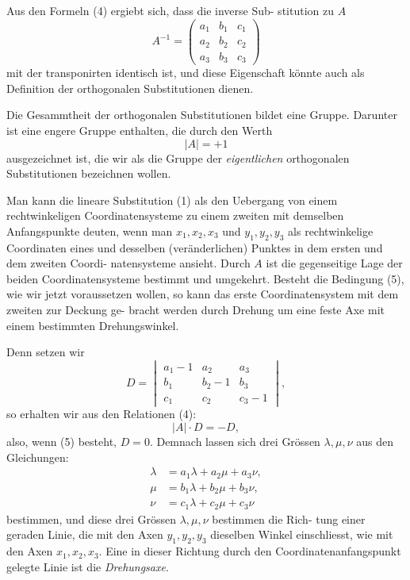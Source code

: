 \documentclass[12pt,a4paper]{article}
\theoremstyle{plain}
\theoremstyle{definition}
\theoremstyle{remark}
\begin{document}
Aus den Formeln (4) ergiebt sich, dass die inverse Sub-
stitution zu $A$
\[
A^{-1} = \begin{pmatrix}
a_1 & b_1 & c_1\\
a_2 & b_2 & c_2\\
a_3 & b_3 & c_3
\end{pmatrix}
\]
mit der transponirten identisch ist, und diese Eigenschaft k\"onnte
auch als Definition der orthogonalen Substitutionen dienen.

Die Gesammtheit der orthogonalen Substitutionen bildet
eine Gruppe. Darunter ist eine engere Gruppe enthalten, die
durch den Werth
\begin{equation}\label{eq:48_5}
|A| = +1\tag{5}
\end{equation}
ausgezeichnet ist, die wir als die Gruppe der \emph{eigentlichen}
orthogonalen Substitutionen bezeichnen wollen.

Man kann die lineare Substitution (1) als den Uebergang
von einem rechtwinkeligen Coordinatensysteme zu einem zweiten
mit demselben Anfangspunkte deuten, wenn man $x_1, x_2, x_3$ und
$y_1, y_2, y_3$ als rechtwinkelige Coordinaten eines und desselben
(ver\"anderlichen) Punktes in dem ersten und dem zweiten Coordi-
natensysteme ansieht. Durch $A$ ist die gegenseitige Lage der
beiden Coordinatensysteme bestimmt und umgekehrt. Besteht
die Bedingung (5), wie wir jetzt voraussetzen wollen, so kann
das erste Coordinatensystem mit dem zweiten zur Deckung ge-
bracht werden durch Drehung um eine feste Axe mit einem
bestimmten Drehungswinkel.

Denn setzen wir
\[
D = \begin{vmatrix}
a_1-1 & a_2 & a_3\\
b_1 & b_2-1 & b_3\\
c_1 & c_2 & c_3-1
\end{vmatrix},
\]
so erhalten wir aus den Relationen (4):
\[
|A|\cdot D = -D,
\]
also, wenn (5) besteht, $D=0$. Demnach lassen sich drei
Gr\"ossen $\lambda, \mu, \nu$ aus den Gleichungen:
\begin{equation}\label{eq:48_6}
\begin{aligned}
\lambda &= a_1\lambda + a_2\mu + a_3\nu,\\
\mu &= b_1\lambda + b_2\mu + b_3\nu,\\
\nu &= c_1\lambda + c_2\mu + c_3\nu
\end{aligned}\tag{6}
\end{equation}
bestimmen, und diese drei Gr\"ossen $\lambda, \mu, \nu$ bestimmen die Rich-
tung einer geraden Linie, die mit den Axen $y_1, y_2, y_3$ dieselben
Winkel einschliesst, wie mit den Axen $x_1, x_2, x_3$. Eine in dieser
Richtung durch den Coordinatenanfangspunkt gelegte Linie ist
die \emph{Drehungsaxe}.
\end{document}

